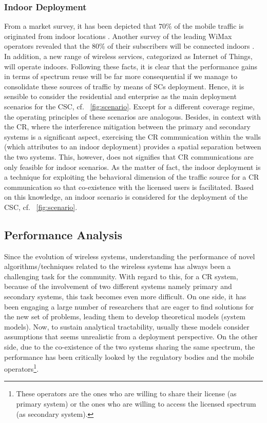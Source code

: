 \subsubsection*{Indoor Deployment}
From a market survey, it has been depicted that $70\%$ of the mobile traffic is originated from indoor locations \cite{Chander08}. Another survey of the leading WiMax operators revealed that the $80\%$ of their subscribers will be connected indoors \cite{Pao07}. In addition, a new range of wireless services, categorized as Internet of Things, will operate indoors. Following these facts, it is clear that the performance gains in terms of spectrum reuse will be far more consequential if we manage to consolidate these sources of traffic by means of SCs deployment. Hence, it is sensible to consider the residential and enterprise as the main deployment scenarios for the CSC, cf. \figurename~\ref{fig:scenario}. Except for a different coverage regime, the operating principles of these scenarios are analogous. Besides, in context with the CR, where the interference mitigation between the primary and secondary systems is a significant aspect, exercising the CR communication within the walls (which attributes to an indoor deployment) provides a spatial separation between the two systems. This, however, does not signifies that CR communications are only feasible for indoor scenarios. As the matter of fact, the indoor deployment is a technique for exploiting the behavioral dimension of the traffic source for a CR communication so that co-existence with the licensed users is facilitated. 
Based on this knowledge, an indoor scenario is considered for the deployment of the CSC, cf. \figurename~\ref{fig:scenario}.  

\subsection{Performance Analysis}
Since the evolution of wireless systems, understanding the performance of novel algorithms/techniques related to the wireless systems has always been a challenging task for the community. With regard to this, for a CR system, because of the involvement of two different systems namely primary and secondary systems, this task becomes even more difficult. On one side, it has been engaging a large number of researchers that are eager to find solutions for the new set of problems, leading them to develop theoretical models (system models). Now, to sustain analytical tractability, usually these models consider assumptions that seems unrealistic from a deployment perspective.  %
 On the other side, due to the co-existence of the two systems sharing the same spectrum, the performance has been critically looked by the regulatory bodies and the mobile operators\footnote{These operators are the ones who are willing to share their license (as primary system) or the ones who are willing to access the licensed spectrum (as secondary system).}. 

